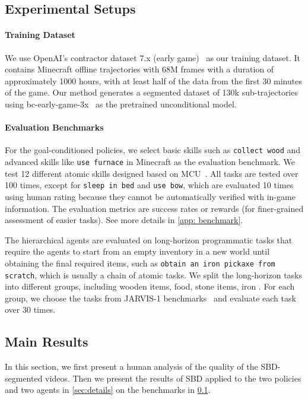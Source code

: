 \subsection{Experimental Setups}
\label{sec:setup}

\paragraph{Training Dataset}
We use OpenAI's contractor dataset 7.x (early game)~\citep{vpt} as our training dataset. It contains Minecraft offline trajectories with 68M frames with a duration of approximately 1000 hours, with at least half of the data from the first 30 minutes of the game. Our method generates a segmented dataset of 130k sub-trajectories using bc-early-game-3x~\citep{vpt} as the pretrained unconditional model. 

\paragraph{Evaluation Benchmarks}
For the goal-conditioned policies, we select basic skills such as \texttt{collect wood} and advanced skills like \texttt{use furnace} in Minecraft as the evaluation benchmark.
We test 12 different atomic skills designed based on MCU~\citep{mcu}.
All tasks are tested over 100 times, except for \texttt{sleep in bed} and \texttt{use bow}, which are evaluated 10 times using human rating because they cannot be automatically verified with in-game information.
The evaluation metrics are success rates or rewards (for finer-grained assessment of easier tasks). 
See more details in \cref{app: benchmark}.

The hierarchical agents are evaluated on long-horizon programmatic tasks that require the agents to start from an empty inventory in a new world until obtaining the final required items, such as \texttt{obtain an iron pickaxe from scratch}, which is usually a chain of atomic tasks. 
We split the long-horizon tasks into different groups, including wooden items, food, stone items, iron \etc.
For each group, we choose the tasks from JARVIS-1 benchmarks~\citep{jarvis-1} and evaluate each task over 30 times. 

\subsection{Main Results}

In this section, we first present a human analysis of the quality of the SBD-segmented videos. Then we present the results of SBD applied to the two policies and two agents in \cref{sec:details} on the benchmarks in \cref{sec:setup}.

